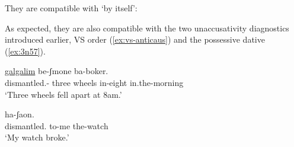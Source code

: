 \begin{exe}
\begin{xlist}
\begin{xlist}
\begin{exe}
\begin{xlist}
\begin{xlist}
\begin{exe}
\begin{xlist}
\begin{xlist}
\begin{exe}
\begin{exe}
\begin{xlist}
\begin{exe}
\begin{exe}
\begin{xlist}
\begin{exe}
\begin{exe}
\begin{exe}
\begin{exe}
\begin{exe}
\begin{xlist}
\begin{exe}
\begin{xlist}
\begin{exe}
\begin{exe}
\begin{xlist}
\begin{exe}
\begin{xlist}
\begin{exe}
\begin{exe}
\begin{exe}
\begin{xlist}
\begin{exe}
\begin{exe}
\begin{exe}
\begin{xlist}
\begin{exe}
\begin{xlist}
\begin{exe}
\begin{xlist}
\begin{exe}
\begin{xlist}
\begin{exe}
\begin{exe}
\begin{exe}
\begin{exe}
\begin{xlist}
\begin{exe}
\begin{xlist}
\begin{exe}
\begin{xlist}
\begin{exe}
\begin{xlist}
\begin{exe}
\begin{xlist}
\begin{exe}
\begin{xlist}
\begin{exe}
\begin{exe}
\begin{exe}
\begin{exe}
\begin{xlist}
\begin{exe}
\begin{xlist}
\begin{exe}
\begin{xlist}
\begin{exe}
\begin{exe}
\begin{xlist}
\begin{exe}
They are compatible with `by itself':
 \begin{exe}
	
 \z 

As expected, they are also compatible with the two unaccusativity diagnostics introduced earlier, VS order (\ref{ex:vs-anticaus}) and the possessive dative (\ref{ex:3n57}).
 \begin{exe}
\ex \label{ex:vs-anticaus}  
 { \gll {}  \underline{galgalim} be-ʃmone ba-boker.\\
 	  dismantled.- three wheels in-eight in.the-morning\\
 	\glt `Three wheels fell apart at 8am.' } 
	
 \ex  \label{ex:3n57}
 { \gll {}  ha-ʃaon.\\
   dismantled. to-me the-watch\\
 \glt `My watch broke.' } 

 \z 


\end{exe}
\end{exe}
\end{exe}
\end{xlist}
\end{exe}
\end{exe}
\end{xlist}
\end{exe}
\end{xlist}
\end{exe}
\end{xlist}
\end{exe}
\end{exe}
\end{exe}
\end{exe}
\end{xlist}
\end{exe}
\end{xlist}
\end{exe}
\end{xlist}
\end{exe}
\end{xlist}
\end{exe}
\end{xlist}
\end{exe}
\end{xlist}
\end{exe}
\end{exe}
\end{exe}
\end{exe}
\end{xlist}
\end{exe}
\end{xlist}
\end{exe}
\end{xlist}
\end{exe}
\end{xlist}
\end{exe}
\end{exe}
\end{exe}
\end{xlist}
\end{exe}
\end{exe}
\end{exe}
\end{xlist}
\end{exe}
\end{xlist}
\end{exe}
\end{exe}
\end{xlist}
\end{exe}
\end{xlist}
\end{exe}
\end{exe}
\end{exe}
\end{exe}
\end{exe}
\end{xlist}
\end{exe}
\end{exe}
\end{xlist}
\end{exe}
\end{exe}
\end{xlist}
\end{xlist}
\end{exe}
\end{xlist}
\end{xlist}
\end{exe}
\end{xlist}
\end{xlist}
\end{exe}
